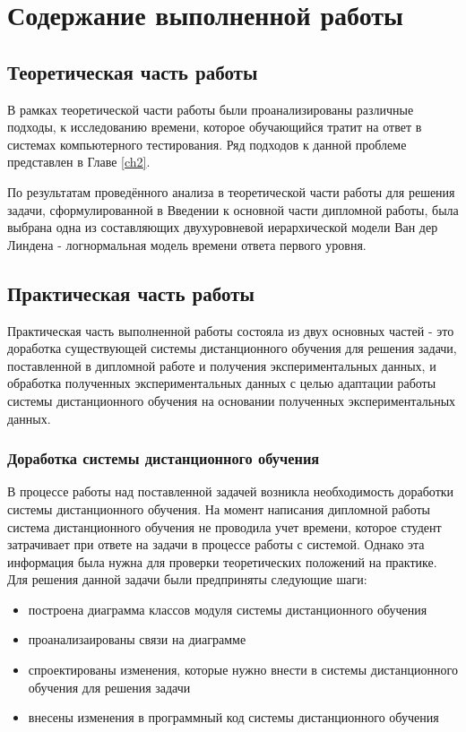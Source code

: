  \chapter{Содержание выполненной работы}

\section{Теоретическая часть работы}

В рамках теоретической части работы были проанализированы различные подходы, к исследованию времени, которое обучающийся тратит на ответ в системах компьютерного тестирования. Ряд подходов к данной проблеме  представлен в Главе \ref{ch2}. 

По результатам проведённого анализа в теоретической части работы для решения задачи, сформулированной в Введении к основной части дипломной работы, была выбрана одна из составляющих двухуровневой иерархической модели Ван дер Линдена - логнор\-мальная модель времени ответа первого уровня.

\section{Практическая часть работы}

Практическая часть выполненной работы состояла из двух основных час\-тей - это доработка существующей системы дистанционного обучения для решения задачи, постав\-ленной в дипломной работе и получения экспери\-ментальных данных, и обработка получен\-ных экспериментальных данных с целью адап\-тации работы системы дистанционного обуче\-ния на основании полученных экспериментальных данных.

\subsection{Доработка системы дистанционного обучения}

В процессе работы над поставленной задачей возникла необходимость доработки сис\-темы дистанционного обучения. На момент написания дип\-ломной работы система дистан\-ционного обучения не проводила учет времени, которое студент затрачивает при ответе на задачи в процессе работы с сис\-темой. Однако эта информация была нужна для проверки теоретических положений на практике. Для решения данной задачи были предприняты следующие шаги:

\begin{itemize}
\item построена диаграмма классов модуля системы дистанционного обучения
\item проанализаированы связи на диаграмме
\item спроектированы изменения, которые нужно внести в системы дистан\-ционного обуче\-ния для решения задачи
\item внесены изменения в программный код системы дистанционного обучения
\end{itemize}

